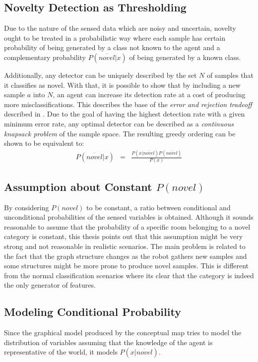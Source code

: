 \documentclass[9pt,a4paper]{extarticle}
\begin{document}
\begin{multicols}{2}
\subsection{Novelty Detection as Thresholding}
Due to the nature of the sensed data which are noisy and uncertain, novelty ought to be
treated in a probabilistic way where each sample has certain probability
of being generated by a class not known to the agent and a complementary probability $P(\overline{novel}|x)$
of being generated by a known class.

Additionally, any detector can be uniquely described by the set $N$ of samples that it
classifies as novel. With that, it is possible to show that by including a new sample $a$ into 
$N$, an agent can increase its detection rate at a cost of producing more misclassifications.
This describes the base of the \emph{error and rejection tradeoff} described in \cite{chow1970optimum}.
Due to the goal of having the highest detection rate with a given minimum error rate, any optimal
detector can be described as a \emph{continuous knapsack problem} of the sample space.
The resulting greedy ordering can be shown to be equivalent to:
\begin{eqnarray}
P(\overline{novel}|x) &=& \frac{P(x|\overline{novel})P(\overline{novel})}{P(x)}
\end{eqnarray}

\subsection{Assumption about Constant $P(novel)$}
By considering $P(novel)$ to be constant, a ratio between conditional and unconditional probabilities
of the sensed variables is obtained. Although it sounds reasonable to assume that the probability of a specific 
room belonging to a novel category is constant, this thesis points out that this assumption might be very strong 
and not reasonable in realistic scenarios. The main problem is related to the fact that the graph structure
changes as the robot gathers new samples and some structures might be more prone to produce novel samples. This
is different from the normal classification scenarios where its clear that the category is indeed the only 
generator of features.

\subsection{Modeling Conditional Probability}
Since the graphical model produced by the conceptual map tries to model the distribution of
variables assuming that the knowledge of the agent is representative of the world, it models $P(x|\overline{novel})$.


\end{multicols}
\end{document}
